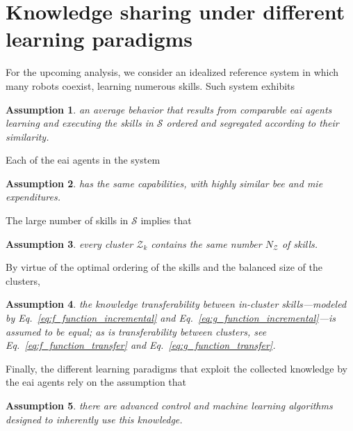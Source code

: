 \documentclass[12pt]{article}
\newtheorem{assumption}{Assumption}
\begin{document}
\section*{Knowledge sharing under different learning paradigms}
For the upcoming analysis, we consider an idealized reference system in which many robots coexist, learning numerous skills. Such system exhibits
\begin{tcolorbox}
	\begin{assumption}\label{assumption:average_behavior}
		an average behavior that results from comparable \ac{eai} agents learning and executing the skills in $\mathcal{S}$ ordered and segregated according to their similarity.
	\end{assumption}
\end{tcolorbox}
\noindent Each of the \ac{eai} agents in the system
\begin{tcolorbox}
	\begin{assumption}\label{assumption:agent_similarity}
		has the same capabilities, with highly similar \ac{bee} and \ac{mie} expenditures.
	\end{assumption}
\end{tcolorbox}
\noindent The large number of skills in $\mathcal{S}$ implies that
\begin{tcolorbox}
	\begin{assumption}\label{assumption:cluster_size}
		every cluster $\mathcal{Z}_{k}$ contains the same number $N_{\mathcal{Z}} $ of skills.
	\end{assumption}
\end{tcolorbox}
\noindent By virtue of the optimal ordering of the skills and the balanced size of the clusters,
\begin{tcolorbox}
	\begin{assumption}\label{assumption:cluster_transferability}
		the knowledge transferability between in-cluster skills---modeled by Eq.~\eqref{eq:f_function_incremental} and Eq.~\eqref{eq:g_function_incremental}---is assumed to be equal; as is transferability between clusters, see Eq.~\eqref{eq:f_function_transfer} and Eq.~\eqref{eq:g_function_transfer}.
	\end{assumption}
\end{tcolorbox}
\noindent Finally, the different learning paradigms that exploit the collected knowledge by the \ac{eai} agents rely on the assumption that
\begin{tcolorbox}
	\begin{assumption}\label{assumption:enabling_agorithms}
		there are advanced control and machine learning algorithms designed to inherently use this knowledge.
	\end{assumption}
\end{tcolorbox}
\end{document}

